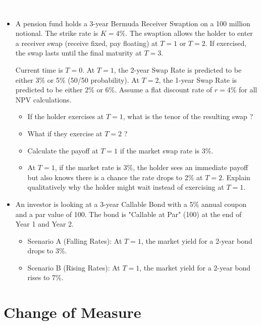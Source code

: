 \documentclass{beamer}
\begin{document}
\begin{homework}
	\begin{frame}{\textcolor{white}{Homework}}
		\begin{itemize}
			\item[white] A pension fund holds a 3-year Bermuda Receiver Swaption on a 100 million notional. The strike rate is $K=4\%$.
			The swaption allows the holder to enter a receiver swap (receive fixed, pay floating) at $T=1$ or $T=2$. If exercised, the swap lasts until the final maturity at $T=3$.
			
			Current time is $T=0$. At $T=1$, the 2-year Swap Rate is predicted to be either 3\% or 5\% (50/50 probability). At $T=2$, the 1-year Swap Rate is predicted to be either 2\% or 6\%.
			Assume a flat discount rate of $r=4\%$ for all NPV calculations.
			
			\begin{itemize}
				\item[white] If the holder exercises at $T=1$, what is the tenor of the resulting swap ?
				\item[white] What if they exercise at $T=2$ ?
				\item[white] Calculate the payoff at $T=1$ if the market swap rate is 3\%.
				\item[white] At $T=1$, if the market rate is 3\%, the holder sees an immediate payoff but also knows there is a chance the rate drops to 2\% at $T=2$. Explain qualitatively why the holder might wait instead of exercising at $T=1$.
			\end{itemize}
			\item[white] An investor is looking at a 3-year Callable Bond with a 5\% annual coupon and a par value of 100. The bond is "Callable at Par" (100) at the end of Year 1 and Year 2.
			\begin{itemize}
				\item[white] Scenario A (Falling Rates): At $T=1$, the market yield for a 2-year bond drops to 3\%.
				\item[white] Scenario B (Rising Rates): At $T=1$, the market yield for a 2-year bond rises to 7\%.
			\end{itemize}
			
		\end{itemize}
	\end{frame}
\end{homework}


\section{Change of Measure}
\end{document}
